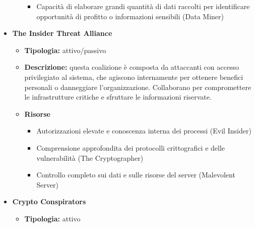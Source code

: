\begin{itemize}
\begin{itemize}
\begin{itemize}
                        \vspace{3mm}

                        \item Capacità di elaborare grandi quantità di dati raccolti per identificare opportunità di profitto o informazioni sensibili (Data Miner)
                    \end{itemize}
            \end{itemize}


        \item \textbf{The Insider Threat Alliance}
            \begin{itemize}
                \item \textbf{Tipologia:} attivo/passivo

                \item \textbf{Descrizione:} questa coalizione è composta da attaccanti con accesso privilegiato al sistema, che agiscono internamente per ottenere benefici personali o danneggiare l'organizzazione.
                Collaborano per compromettere le infrastrutture critiche e sfruttare le informazioni riservate.

                \item \textbf{Risorse}
                    \begin{itemize}
                        \item Autorizzazioni elevate e conoscenza interna dei processi (Evil Insider)
                        
                        \vspace{3mm}

                        \item Comprensione approfondita dei protocolli crittografici e delle vulnerabilità (The Cryptographer)

                        \vspace{3mm}

                        \item Controllo completo sui dati e sulle risorse del server (Malevolent Server)
                    \end{itemize}
            \end{itemize}


        \item \textbf{Crypto Conspirators}
            \begin{itemize}
                \item \textbf{Tipologia:} attivo


\end{itemize}
\end{itemize}
